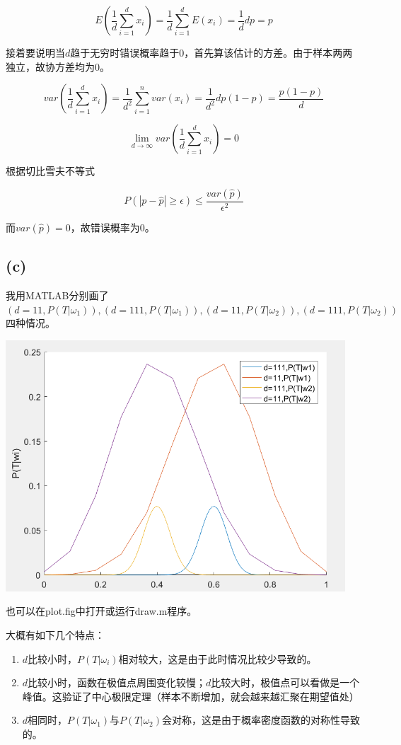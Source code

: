 \documentclass{ctexart}
\begin{document}
\[E(\frac{1}{d}\sum_{i=1}^dx_i)=\frac{1}{d}\sum_{i=1}^dE(x_i)=\frac{1}{d}dp=p\]

接着要说明当$d$趋于无穷时错误概率趋于$0$，首先算该估计的方差。由于样本两两独立，故协方差均为$0$。

\[var(\frac{1}{d}\sum_{i=1}^d x_i)=\frac{1}{d^2}\sum_{i=1}^nvar(x_i)=\frac{1}{d^2}dp(1-p)=\frac{p(1-p)}{d}\]

\[\lim_{d \rightarrow \infty} var(\frac{1}{d} \sum_{i=1}^d x_i)=0\]

根据切比雪夫不等式

\[P(|p-\hat{p}| \ge \epsilon)\le \frac{var(\hat{p})}{\epsilon^2}\]

而$var(\hat{p})=0$，故错误概率为$0$。
\subsection*{(c)}
我用MATLAB分别画了$(d=11,P(T|\omega_1)),(d=111,P(T|\omega_1)),(d=11,P(T|\omega_2)),(d=111,P(T|\omega_2))$四种情况。

\includegraphics[width=5in]{plot.png}

也可以在plot.fig中打开或运行draw.m程序。

大概有如下几个特点：

\begin{enumerate}
\item
$d$比较小时，$P(T|\omega_i)$相对较大，这是由于此时情况比较少导致的。
\item
$d$比较小时，函数在极值点周围变化较慢；$d$比较大时，极值点可以看做是一个峰值。这验证了中心极限定理（样本不断增加，就会越来越汇聚在期望值处）
\item
$d$相同时，$P(T|\omega_1)$与$P(T|\omega_2)$会对称，这是由于概率密度函数的对称性导致的。
\end{enumerate}
\end{document}
